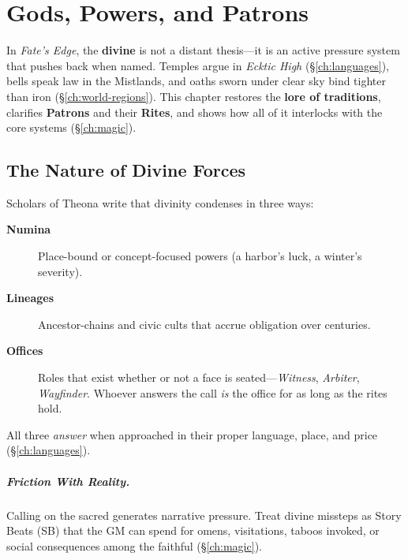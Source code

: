 
\chapter{Gods, Powers, and Patrons}
\label{ch:gods-powers-patrons}

\begin{multicols}{2}

In \textit{Fate’s Edge}, the \textbf{divine} is not a distant thesis—it is an active pressure system that pushes back when named. Temples argue in \emph{Ecktic High} (\S\ref{ch:languages}), bells speak law in the Mistlands, and oaths sworn under clear sky bind tighter than iron (\S\ref{ch:world-regions}). This chapter restores the \textbf{lore of traditions}, clarifies \textbf{Patrons} and their \textbf{Rites}, and shows how all of it interlocks with the core systems (\S\ref{ch:magic}).

\section{The Nature of Divine Forces}
Scholars of Theona write that divinity condenses in three ways:
\begin{description}
  \item[\textbf{Numina}]  Place-bound or concept-focused powers (a harbor’s luck, a winter’s severity).
  \item[\textbf{Lineages}]  Ancestor-chains and civic cults that accrue obligation over centuries.
  \item[\textbf{Offices}]  Roles that exist whether or not a face is seated—\emph{Witness}, \emph{Arbiter}, \emph{Wayfinder}. Whoever answers the call \emph{is} the office for as long as the rites hold.
\end{description}
All three \emph{answer} when approached in their proper language, place, and price (\S\ref{ch:languages}).

\paragraph{Friction With Reality.}
Calling on the sacred generates narrative pressure. Treat divine missteps as Story Beats (SB) that the GM can spend for omens, visitations, taboos invoked, or social consequences among the faithful (\S\ref{ch:magic}).


\end{multicols}

